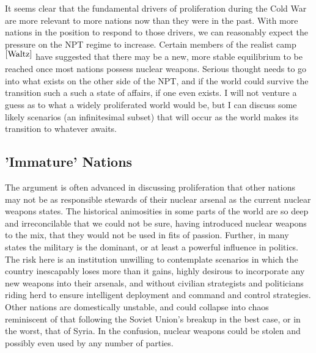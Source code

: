 \documentclass[journal]{IEEEtran}
\begin{document}
It seems clear that the fundamental drivers of proliferation during the Cold War are more relevant to more nations now than they were in the past.  With more nations in the position to respond to those drivers, we can reasonably expect the pressure on the NPT regime to increase.  Certain members of the realist camp$^{\cite{Waltz}}$ have suggested that there may be a new, more stable equilibrium to be reached once most nations possess nuclear weapons.  Serious thought needs to go into what exists on the other side of the NPT, and if the world could survive the transition such a such a state of affairs, if one even exists.  I will not venture a guess as to what a widely proliferated world would be, but I can discuss some likely scenarios (an infinitesimal subset) that will occur as the world makes its transition to whatever awaits. 
\subsection{'Immature' Nations}
The argument is often advanced in discussing proliferation that other nations may not be as responsible stewards of their nuclear arsenal as the current nuclear weapons states.  The historical animosities in some parts of the world are so deep and irreconcilable that we could not be sure, having introduced nuclear weapons to the mix, that they would not be used in fits of passion.  Further, in many states the military is the dominant, or at least a powerful influence in politics.  The risk here is an institution unwilling to contemplate scenarios in which the country inescapably loses more than it gains, highly desirous to incorporate any new weapons into their arsenals, and without civilian strategists and politicians riding herd to ensure intelligent deployment and command and control strategies.  Other nations are domestically unstable, and could collapse into chaos reminiscent of that following the Soviet Union's breakup in the best case, or in the worst, that of Syria.  In the confusion, nuclear weapons could be stolen and possibly even used by any number of parties.\par 
\end{document}
